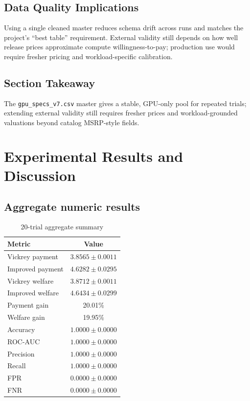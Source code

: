 \documentclass[journal]{IEEEtran}
\begin{document}
\subsection{Data Quality Implications}
Using a single cleaned master reduces schema drift across runs and matches the project's ``best table'' requirement. External validity still depends on how well release prices approximate compute willingness-to-pay; production use would require fresher pricing and workload-specific calibration.

\subsection{Section Takeaway}
The \texttt{gpu\_specs\_v7.csv} master gives a stable, GPU-only pool for repeated trials; extending external validity still requires fresher prices and workload-grounded valuations beyond catalog MSRP-style fields.

\section{Experimental Results and Discussion}
\subsection{Aggregate numeric results}
\begin{table}[t]
\centering
\caption{20-trial aggregate summary}
\label{tab:results}
\begin{tabular}{lc}
\toprule
\textbf{Metric} & \textbf{Value} \\
\midrule
Vickrey payment & $3.8565 \pm 0.0011$ \\
Improved payment & $4.6282 \pm 0.0295$ \\
Vickrey welfare & $3.8712 \pm 0.0011$ \\
Improved welfare & $4.6434 \pm 0.0299$ \\
Payment gain & 20.01\% \\
Welfare gain & 19.95\% \\
\midrule
Accuracy & $1.0000 \pm 0.0000$ \\
ROC-AUC & $1.0000 \pm 0.0000$ \\
Precision & $1.0000 \pm 0.0000$ \\
Recall & $1.0000 \pm 0.0000$ \\
FPR & $0.0000 \pm 0.0000$ \\
FNR & $0.0000 \pm 0.0000$ \\
\bottomrule
\end{tabular}
\end{table}
\end{document}
